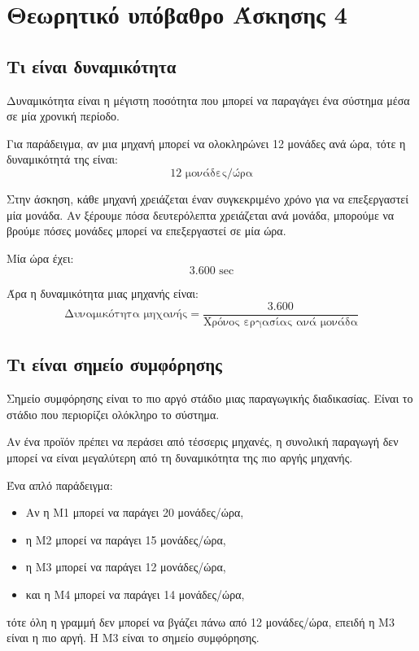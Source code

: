\documentclass[12pt,a4paper]{article}
\begin{document}
\section{Θεωρητικό υπόβαθρο Άσκησης 4}

\subsection{Τι είναι δυναμικότητα}

Δυναμικότητα είναι η μέγιστη ποσότητα που μπορεί να παραγάγει ένα σύστημα μέσα σε μία χρονική περίοδο.

Για παράδειγμα, αν μια μηχανή μπορεί να ολοκληρώνει 12 μονάδες ανά ώρα, τότε η δυναμικότητά της είναι:
\[
12 \text{ μονάδες/ώρα}
\]

Στην άσκηση, κάθε μηχανή χρειάζεται έναν συγκεκριμένο χρόνο για να επεξεργαστεί μία μονάδα. Αν ξέρουμε πόσα δευτερόλεπτα χρειάζεται ανά μονάδα, μπορούμε να βρούμε πόσες μονάδες μπορεί να επεξεργαστεί σε μία ώρα.

Μία ώρα έχει:
\[
3.600 \text{ sec}
\]

Άρα η δυναμικότητα μιας μηχανής είναι:
\[
\text{Δυναμικότητα μηχανής}=
\frac{3.600}{\text{Χρόνος εργασίας ανά μονάδα}}
\]

\subsection{Τι είναι σημείο συμφόρησης}

Σημείο συμφόρησης είναι το πιο αργό στάδιο μιας παραγωγικής διαδικασίας. Είναι το στάδιο που περιορίζει ολόκληρο το σύστημα.

Αν ένα προϊόν πρέπει να περάσει από τέσσερις μηχανές, η συνολική παραγωγή δεν μπορεί να είναι μεγαλύτερη από τη δυναμικότητα της πιο αργής μηχανής.

Ένα απλό παράδειγμα:

\begin{itemize}
    \item Αν η Μ1 μπορεί να παράγει 20 μονάδες/ώρα,
    \item η Μ2 μπορεί να παράγει 15 μονάδες/ώρα,
    \item η Μ3 μπορεί να παράγει 12 μονάδες/ώρα,
    \item και η Μ4 μπορεί να παράγει 14 μονάδες/ώρα,
\end{itemize}

τότε όλη η γραμμή δεν μπορεί να βγάζει πάνω από 12 μονάδες/ώρα, επειδή η Μ3 είναι η πιο αργή. Η Μ3 είναι το σημείο συμφόρησης.
\end{document}
